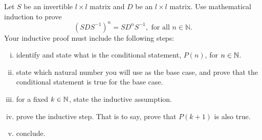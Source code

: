 \begin{question}
\normalfont
Let $S$ be an invertible $l \times l$ matrix and $D$ be an $l \times l$ matrix. Use mathematical induction to prove 
$$
\left(S D S^{-1} \right)^n = S D^n S^{-1}, \text{ for all } n \in \mathbb{N}.
$$ 
Your inductive proof must include the following steps:
	\begin{enumerate}[(i)]
		\item identify and state what is the conditional statement, $P(n)$, for $n\in \mathbb{N}$.
		\item state which natural number you will use as the base case, and prove that the conditional statement is true for the base case.
		\item for a fixed $k\in\mathbb{N}$, state the inductive assumption.
		\item prove the inductive step.  That is to say, prove that $P(k+1)$ is also true.
		\item conclude.
	\end{enumerate}
\end{question}
